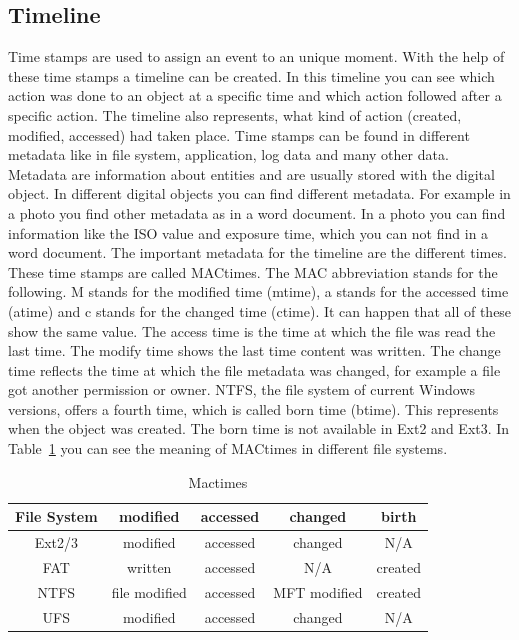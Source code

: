 
\subsection{Timeline}

Time stamps are used to assign an event to an unique moment.
With the help of these time stamps a timeline can be created. 
In this timeline you can see which action was done to an object at a specific time and which action followed after a specific action. 
The timeline also  represents, what kind of action (created, modified, accessed) had taken place. 
Time stamps can be found in different metadata like in file system, application, log data and many other data. 
Metadata are information about entities and are usually stored with the digital object. 
In different digital objects you can find different metadata. 
For example in a photo you find other metadata as in a word document. 
In a photo you can find information like the ISO value and exposure time, which you can not find in a word document. 
The important metadata for the timeline are the different times. 
These time stamps are called MACtimes. 
The MAC abbreviation stands for the following. 
M stands for the modified time (mtime), a  stands for the accessed time (atime) and c stands for the changed time (ctime). 
It can happen that all of these show the same value. 
The access time is the time at which the file was read the last time. 
The modify time shows the last time content was written.
The change time reflects the time at which the file metadata was changed, for example a file got another permission or owner. 
NTFS, the file system of current Windows versions, offers a fourth time, which is called born time (btime). 
This represents when the object was created.
The born time is not available in Ext2 and Ext3. 
In Table~\ref{fig:Mactimes} you can see the meaning of MACtimes in different file systems. 

\begin{table}[h]

\begin{tabular}{c|c|c|c|c}
	File System & modified & accessed & changed & birth \\
	\hline \hline
	Ext2/3 & modified & accessed & changed & N/A \\
	\hline
	FAT & written & accessed & N/A & created \\
	\hline
	NTFS & file modified & accessed & MFT modified & created \\
	\hline
	UFS & modified & accessed & changed & N/A \\

\end{tabular}

\caption{Mactimes}
\label{fig:Mactimes}
\end{table}

